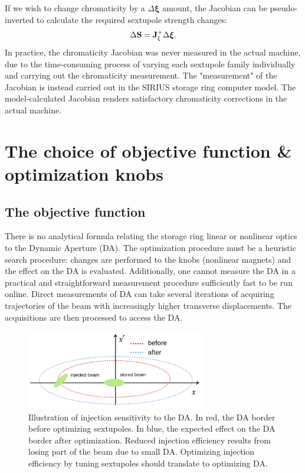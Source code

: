 If we wish to change chromaticity by a $\Delta\boldsymbol{\xi}$ amount, the Jacobian can be pseudo-inverted to calculate the required sextupole strength changes:
\begin{equation}
    \Delta \vb{S} = \vb{J}_{\xi}^{+}\Delta \boldsymbol{\xi}.
\end{equation}
In practice, the chromaticity Jacobian was never measured in the actual machine, due to the time-consuming process of varying each sextupole family individually and carrying out the chromaticity measurement. The "measurement" of the Jacobian is instead carried out in the SIRIUS storage ring computer model. The model-calculated Jacobian renders satisfactory chromaticity corrections in the actual machine.

\section{The choice of objective function \& optimization knobs}

\subsection{The objective function}
\label{subsec:objective_function}
There is no analytical formula relating the storage ring linear or nonlinear optics to the Dynamic Aperture (DA). The optimization procedure must be a heuristic search procedure: changes are performed to the knobs (nonlinear magnets) and the effect on the DA is evaluated. Additionally, one cannot measure the DA in a practical and straightforward measurement procedure sufficiently fast to be run online. Direct measurements of DA can take several iterations of acquiring trajectories of the beam with increasingly higher transverse displacements. The acquisitions are then processed to access the DA.

\begin{figure}
    \centering
    \includegraphics[width=0.7\textwidth]{Images/injection_illustration.png}
    \caption[Illustration of injection sensitivity to the DA]{Illustration of injection sensitivity to the DA. In red, the DA border before optimizing sextupoles. In blue, the expected effect on the DA border after optimization. Reduced injection efficiency results from losing part of the beam due to small DA. Optimizing injection efficiency by tuning sextupoles should translate to optimizing DA.}
    \label{fig:injection_efficiency}
\end{figure}

